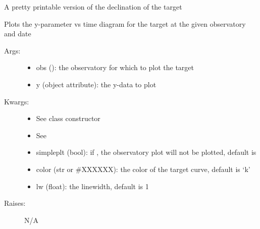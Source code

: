 \documentclass[letterpaper,10pt,english]{sphinxmanual}
\begin{document}
\begin{fulllineitems}
\begin{fulllineitems}
\end{fulllineitems}


\begin{fulllineitems}
\label{astroobs:astroobs.Target.Target.decStr}
A pretty printable version of the declination of the target

\end{fulllineitems}


\begin{fulllineitems}
\label{astroobs:astroobs.Target.Target.plot}
Plots the y-parameter vs time diagram for the target at the given observatory and date
\begin{description}
\item[{Args:}] \leavevmode\begin{itemize}
\item {} 
obs (): the observatory for which to plot the target

\item {} 
y (object attribute): the y-data to plot

\end{itemize}

\item[{Kwargs:}] \leavevmode\begin{itemize}
\item {} 
See class constructor

\item {} 
See 

\item {} 
simpleplt (bool): if , the observatory plot will not be plotted, default is 

\item {} 
color (str or \#XXXXXX): the color of the target curve, default is `k'

\item {} 
lw (float): the linewidth, default is 1

\end{itemize}

\item[{Raises:}] \leavevmode
N/A

\end{description}


\end{fulllineitems}
\end{fulllineitems}
\end{document}
